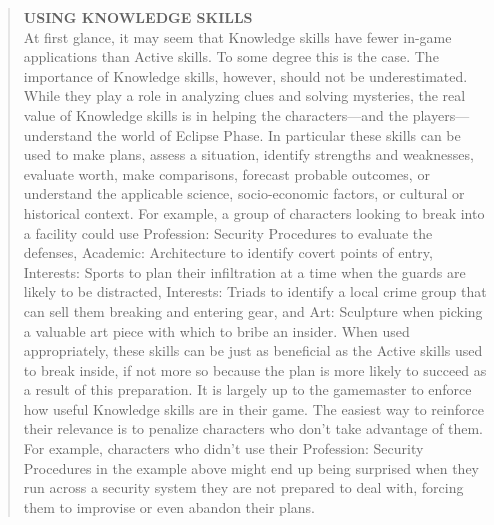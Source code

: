 \begin{quotation} \textbf{USING KNOWLEDGE SKILLS} \\ At first glance, it may seem that Knowledge skills have fewer in-game applications than Active skills. To some degree this is the case. The importance of Knowledge skills, however, should not be underestimated. While they play a role in analyzing clues and solving mysteries, the real value of Knowledge skills is in helping the characters—and the players—understand the world of Eclipse Phase. In particular these skills can be used to make plans, assess a situation, identify strengths and weaknesses, evaluate worth, make comparisons, forecast probable outcomes, or understand the applicable science, socio-economic factors, or cultural or historical context. For example, a group of characters looking to break into a facility could use Profession: Security Procedures to evaluate the defenses, Academic: Architecture to identify covert points of entry, Interests: Sports to plan their infiltration at a time when the guards are likely to be distracted, Interests: Triads to identify a local crime group that can sell them breaking and entering gear, and Art: Sculpture when picking a valuable art piece with which to bribe an insider. When used appropriately, these skills can be just as beneficial as the Active skills used to break inside, if not more so because the plan is more likely to succeed as a result of this preparation. It is largely up to the gamemaster to enforce how useful Knowledge skills are in their game. The easiest way to reinforce their relevance is to penalize characters who don’t take advantage of them. For example, characters who didn’t use their Profession: Security Procedures in the example above might end up being surprised when they run across a security system they are not prepared to deal with, forcing them to improvise or even abandon their plans. \end{quotation} 

